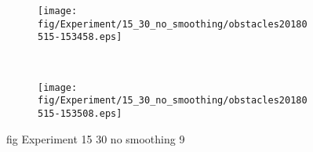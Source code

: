 \begin{figure}[H]
	\centering
	\begin{subfigure}[b]{0.45\textwidth}
		\texttt{[image: fig/Experiment/15\_30\_no\_smoothing/obstacles20180515-153458.eps]}
		\caption{}
		\label{fig:Experiment:15_30_no_smoothing:obstacles20180515-153458}
	\end{subfigure}
	~
	\begin{subfigure}[b]{0.45\textwidth}
		\texttt{[image: fig/Experiment/15\_30\_no\_smoothing/obstacles20180515-153508.eps]}
		\caption{}
		\label{fig:Experiment:15_30_no_smoothing:obstacles20180515-153508}
	\end{subfigure}
	\caption{fig Experiment 15 30 no smoothing 9}
	\label{fig:Experiment:15_30_no_smoothing:9}
\end{figure}

